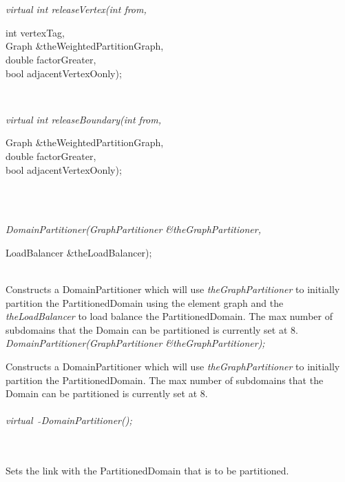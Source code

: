  \\ 
 \\ 
{\em virtual int releaseVertex(int from, 

\indent\indent\indent\indent\indent\indent int vertexTag, \\
\indent\indent\indent\indent\indent\indent Graph \&theWeightedPartitionGraph, \\
\indent\indent\indent\indent\indent\indent double factorGreater, \\
\indent\indent\indent\indent\indent\indent bool adjacentVertexOonly); } \\
{\em virtual int releaseBoundary(int from, 

\indent\indent\indent\indent\indent\indent Graph \&theWeightedPartitionGraph, \\
\indent\indent\indent\indent\indent\indent double factorGreater, \\
\indent\indent\indent\indent\indent\indent bool adjacentVertexOonly); } \\



  \\
{\em DomainPartitioner(GraphPartitioner \&theGraphPartitioner,

\indent\indent\indent	LoadBalancer \&theLoadBalancer);} \\
Constructs a DomainPartitioner which will use {\em
theGraphPartitioner} to initially partition the PartitionedDomain
using the element graph and the {\em theLoadBalancer} to load balance 
the PartitionedDomain. The max number of subdomains that the Domain can be 
partitioned is currently set at 8.\\

{\em DomainPartitioner(GraphPartitioner \&theGraphPartitioner);}

Constructs a DomainPartitioner which will use {\em
theGraphPartitioner} to initially partition the PartitionedDomain. The
max number of subdomains that the Domain can be partitioned is
currently set at 8.\\ 

  \\
{\em virtual~ $\tilde{}$DomainPartitioner();}  



  \\
\\
Sets the link with the PartitionedDomain that is to be partitioned. \\

